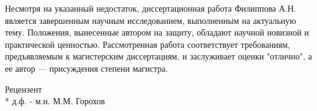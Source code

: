 \begin{titlepage}
Несмотря на указанный недостаток, диссертационная работа Филиппова А.Н. является
завершенным научным исследованием, выполненным на актуальную тему.
Положения, вынесенные автором на защиту, обладают научной новизной
и практической ценностью. Рассмотренная работа соответствует требованиям,
предъявляемым к магистерским диссертациям, и заслуживает оценки "отлично",
а ее автор — присуждения степени магистра.

\vfill
\noindent Рецензент \\*
д.ф. - м.н. \hfill М.М. Горохов

\end{titlepage}



